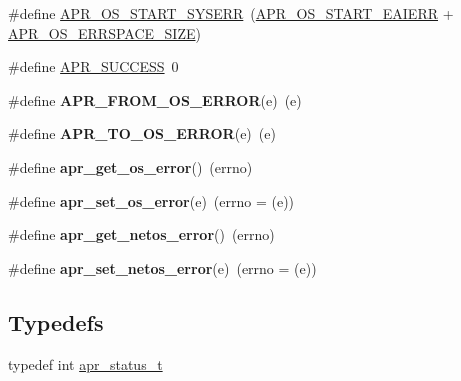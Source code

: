 \begin{DoxyCompactItemize}
\item 
\#define \mbox{\hyperlink{group__apr__errno_gad70a5cad6862a9abcc254d35e827ac8b}{A\+P\+R\+\_\+\+O\+S\+\_\+\+S\+T\+A\+R\+T\+\_\+\+S\+Y\+S\+E\+RR}}~(\mbox{\hyperlink{group__apr__errno_ga2d04991cb57c67a896e22125a1f22b49}{A\+P\+R\+\_\+\+O\+S\+\_\+\+S\+T\+A\+R\+T\+\_\+\+E\+A\+I\+E\+RR}} + \mbox{\hyperlink{group__apr__errno_gadb8d97e6836ccdc57b43b6119a5acccf}{A\+P\+R\+\_\+\+O\+S\+\_\+\+E\+R\+R\+S\+P\+A\+C\+E\+\_\+\+S\+I\+ZE}})
\item 
\#define \mbox{\hyperlink{group__apr__errno_ga9ee311b7bf1c691dc521d721339ee2a6}{A\+P\+R\+\_\+\+S\+U\+C\+C\+E\+SS}}~0
\item 
\mbox{\label{group__apr__errno_ga2096daff578ef301e060b80c7a4525bf}} 
\#define {\bfseries A\+P\+R\+\_\+\+F\+R\+O\+M\+\_\+\+O\+S\+\_\+\+E\+R\+R\+OR}(e)~(e)
\item 
\mbox{\label{group__apr__errno_ga2385cae04b04afbdcb65f1a45c4d8506}} 
\#define {\bfseries A\+P\+R\+\_\+\+T\+O\+\_\+\+O\+S\+\_\+\+E\+R\+R\+OR}(e)~(e)
\item 
\mbox{\label{group__apr__errno_gaa76e122da00af0ce2e8c8d7ff538bdfa}} 
\#define {\bfseries apr\+\_\+get\+\_\+os\+\_\+error}()~(errno)
\item 
\mbox{\label{group__apr__errno_ga9a2d9a03ad314b03a142574be6d7d8a7}} 
\#define {\bfseries apr\+\_\+set\+\_\+os\+\_\+error}(e)~(errno = (e))
\item 
\mbox{\label{group__apr__errno_ga66e54f155b4a80ac7df9118af9bd896a}} 
\#define {\bfseries apr\+\_\+get\+\_\+netos\+\_\+error}()~(errno)
\item 
\mbox{\label{group__apr__errno_gaafc38481621653ece6f592f9c5a9a09b}} 
\#define {\bfseries apr\+\_\+set\+\_\+netos\+\_\+error}(e)~(errno = (e))
\end{DoxyCompactItemize}
\subsection*{Typedefs}
\begin{DoxyCompactItemize}
\item 
typedef int \mbox{\hyperlink{group__apr__errno_gaf76ee4543247e9fb3f3546203e590a6c}{apr\+\_\+status\+\_\+t}}
\end{DoxyCompactItemize}
